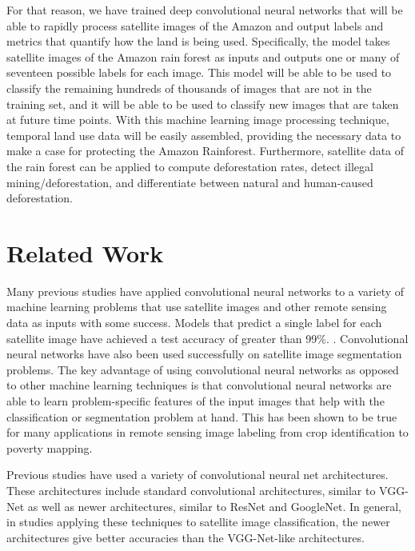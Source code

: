 \documentclass[10pt,twocolumn,letterpaper]{article}
\begin{document}
For that reason, we have trained deep convolutional neural networks that will be able to rapidly process satellite images of the Amazon and output labels and metrics that quantify how the land is being used. Specifically, the model takes satellite images of the Amazon rain forest as inputs and outputs one or many of seventeen possible labels for each image. This model will be able to be used to classify the remaining hundreds of thousands of images that are not in the training set, and it will be able to be used to classify new images that are taken at future time points. With this machine learning image processing technique, temporal land use data will be easily assembled, providing the necessary data to make a case for protecting the Amazon Rainforest. Furthermore, satellite data of the rain forest can be applied to compute deforestation rates, detect illegal mining/deforestation, and differentiate between natural and human-caused deforestation.


\section{Related Work}

Many previous studies have applied convolutional neural networks to a variety of machine learning problems that use satellite images and other remote sensing data as inputs with some success. Models that predict a single label for each satellite image have achieved a test accuracy of greater than 99\%. \cite{background4}. Convolutional neural networks have also been used successfully on satellite image segmentation problems. \cite{background3} \cite{segmentation1}
The key advantage of using convolutional neural networks as opposed to other machine learning techniques is that convolutional neural networks are able to learn problem-specific features of the input images that help with the classification or segmentation problem at hand. \cite{background2} This has been shown to be true for many applications in remote sensing image labeling from crop identification to poverty mapping. \cite{background1} \cite{Ensemble1} \cite{PovertyMapping}

Previous studies have used a variety of convolutional neural net architectures. These architectures include standard convolutional architectures, similar to VGG-Net\cite{VGGNet} as well as newer architectures, similar to ResNet\cite{ResNet} and GoogleNet\cite{GoogleNet}. In general, in studies applying these techniques to satellite image classification, the newer architectures give better accuracies than the VGG-Net-like architectures.\cite{VGG1} \cite{Inception1} \cite{TransferLearning3} \cite{TransferLearning1}
\end{document}
